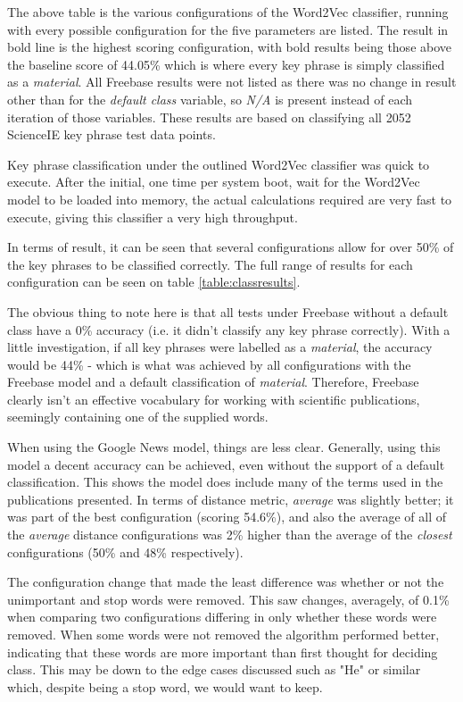 \begin{table}
	\caption[Word2Vec Classification Results]{The above table is the various configurations of the Word2Vec classifier, running with every possible configuration for the five parameters are listed. The result in bold line is the highest scoring configuration, with bold results being those above the baseline score of 44.05\% which is where every key phrase is simply classified as a \textit{material}. All Freebase results were not listed as there was no change in result other than for the \textit{default class} variable, so \textit{N/A} is present instead of each iteration of those variables. These results are based on classifying all 2052 ScienceIE key phrase test data points.}
	\label{table:classresults}
\end{table}

Key phrase classification under the outlined Word2Vec classifier was quick to execute. After the initial, one time per system boot, wait for the Word2Vec model to be loaded into memory, the actual calculations required are very fast to execute, giving this classifier a very high throughput.

In terms of result, it can be seen that several configurations allow for over 50\% of the key phrases to be classified correctly. The full range of results for each configuration can be seen on table \ref{table:classresults}.

The obvious thing to note here is that all tests under Freebase without a default class have a 0\% accuracy (i.e. it didn't classify any key phrase correctly). With a little investigation, if all key phrases were labelled as a \textit{material}, the accuracy would be 44\% - which is what was achieved by all configurations with the Freebase model and a default classification of \textit{material}. Therefore, Freebase clearly isn't an effective vocabulary for working with scientific publications, seemingly containing one of the supplied words. 

When using the Google News model, things are less clear. Generally, using this model a decent accuracy can be achieved, even without the support of a default classification. This shows the model does include many of the terms used in the publications presented. In terms of distance metric, \textit{average} was slightly better; it was part of the best configuration (scoring 54.6\%), and also the average of all of the \textit{average} distance configurations was 2\% higher than the average of the \textit{closest} configurations (50\% and 48\% respectively).

The configuration change that made the least difference was whether or not the unimportant and stop words were removed. This saw changes, averagely, of 0.1\% when comparing two configurations differing in only whether these words were removed. When some words were not removed the algorithm performed better, indicating that these words are more important than first thought for deciding class. This may be down to the edge cases discussed such as "He" or similar which, despite being a stop word, we would want to keep.

